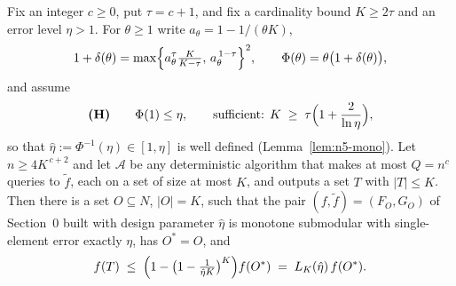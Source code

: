 \begin{theorem}\label{thm:n5-det}
Fix an integer $c\ge0$, put $\tau=c+1$, and fix a cardinality bound
$K\ge 2\tau$ and an error level $\eta>1$.  For $\theta\ge1$ write
$a_\theta=1-1/(\theta K)$,
\[
  1+\delta(\theta)=\max\Bigl\{a_\theta^{\tau}\tfrac{K}{K-\tau},\,
                              a_\theta^{\,1-\tau}\Bigr\}^{2},
  \qquad \Phi(\theta)=\theta\bigl(1+\delta(\theta)\bigr),
\]
and assume
\[
  \textbf{(H)}\qquad \Phi(1)\le\eta,
  \qquad\text{sufficient: } K\;\ge\;\tau\Bigl(1+\frac{2}{\ln\eta}\Bigr),
\]
so that $\hat\eta:=\Phi^{-1}(\eta)\in[1,\eta]$ is well defined
(Lemma~\ref{lem:n5-mono}).  Let $n\ge 4K^{\,c+2}$ and let $\mathcal A$ be any
deterministic algorithm that makes at most $Q=n^{c}$ queries to $\tilde f$,
each on a set of size at most $K$, and outputs a set $T$ with $|T|\le K$.  Then
there is a set $O\subseteq N$, $|O|=K$, such that the pair
$(f,\tilde f)=(F_O,G_O)$ of Section~0 built with design parameter $\hat\eta$ is
monotone submodular with single-element error exactly $\eta$, has
$O^{\ast}=O$, and
\[
  f(T)\;\le\;\Bigl(1-\bigl(1-\tfrac{1}{\hat\eta K}\bigr)^{K}\Bigr)f(O^{\ast})
  \;=\;L_K(\hat\eta)\,f(O^{\ast}).
\]
\end{theorem}
